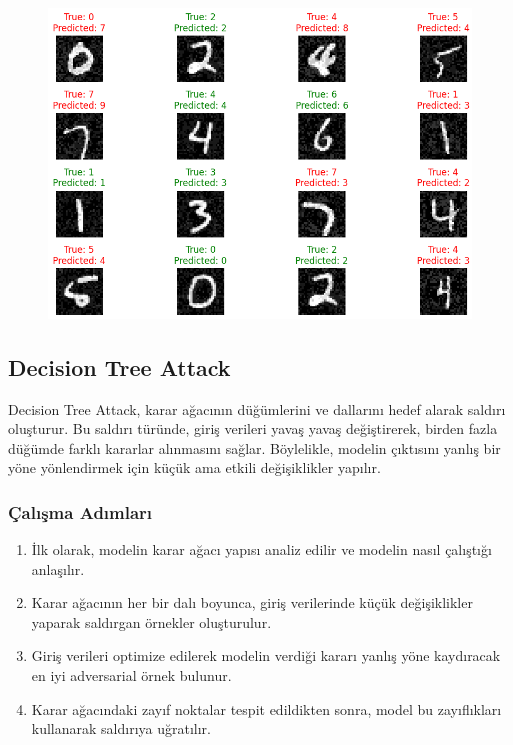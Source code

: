 \newpage

\begin{figure}[h]
    \centering
    \includegraphics[width=1\textwidth]{images/composite_adversarial_attack_results.png}
    \caption{}
\end{figure}

\newpage

\subsection{Decision Tree Attack}

Decision Tree Attack, karar ağacının düğümlerini ve dallarını hedef alarak saldırı oluşturur. Bu saldırı türünde, giriş verileri yavaş yavaş değiştirerek, birden fazla düğümde farklı kararlar alınmasını sağlar. Böylelikle, modelin çıktısını yanlış bir yöne yönlendirmek için küçük ama etkili değişiklikler yapılır.

\subsubsection{Çalışma Adımları}

\begin{enumerate}
    \item İlk olarak, modelin karar ağacı yapısı analiz edilir ve modelin nasıl çalıştığı anlaşılır.
    \item Karar ağacının her bir dalı boyunca, giriş verilerinde küçük değişiklikler yaparak saldırgan örnekler oluşturulur.
    \item Giriş verileri optimize edilerek modelin verdiği kararı yanlış yöne kaydıracak en iyi adversarial örnek bulunur.
    \item Karar ağacındaki zayıf noktalar tespit edildikten sonra, model bu zayıflıkları kullanarak saldırıya uğratılır.
\end{enumerate}

